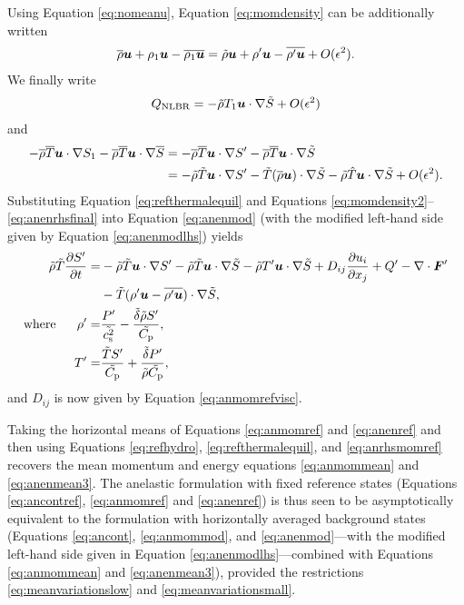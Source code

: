 \documentclass[12pt]{article}
\newcommand{\vecf}{\bm{F}}
\begin{document}
Using Equation \eqref{eq:nomeanu}, Equation \eqref{eq:momdensity} can be additionally written
  \begin{align}\label{eq:momdensity2}
\overline{\rho}\bm{u} + \rho_1\bm{u} - \overline{\rho_1\bm{u}} = \tilde{\rho}\bm{u} + \rho^\prime\bm{u} - \overline{\rho^\prime\bm{u}} + O(\epsilon^2).
\end{align}
We finally write 
\begin{align}
	Q_{\rm NLBR} = -\tilde{\rho} T_1\bm{u}\cdot\nabla\tilde{S} + O(\epsilon^2)
\end{align}
and 
\begin{align}\label{eq:anenrhsfinal}
	-\overline{\rho}\overline{T} \bm{u}\cdot\nabla S_1 - \overline{\rho}\overline{T} \bm{u}\cdot\nabla\overline{S} &= - \overline{\rho}\overline{T}\bm{u}\cdot\nabla S^\prime -\overline{\rho}\overline{T}\bm{u}\cdot\nabla\tilde{S} \nonumber\\
	&=-\tilde{\rho}\tilde{T}\bm{u}\cdot\nabla S^\prime - \tilde{T}(\overline{\rho} \bm{u})\cdot\nabla\tilde{S} - \tilde{\rho}\hat{T}\bm{u}\cdot\nabla\tilde{S} + O(\epsilon^2).
\end{align}
Substituting Equation \eqref{eq:refthermalequil} and Equations \eqref{eq:momdensity2}--\eqref{eq:anenrhsfinal} into Equation \eqref{eq:anenmod} (with the modified left-hand side given by Equation \eqref{eq:anenmodlhs}) yields
\begin{subequations}\label{eq:anenref}
	\begin{align}
		\rhotilde\tilde{T}\pderiv{\entrprime}{t}= &-\rhotilde\tilde{T}\ugrad \entrprime - \rhotilde\tilde{T} \ugrad \entrtilde - \rhotilde \tmpprime\ugrad\entrtilde+D_{ij}\pderiv{u_i}{x_j} + Q^\prime- \Div\vecf^\prime  \nonumber\\
		& - \tilde{T}(\rhoprime \vecu-\overline{\rhoprime\vecu})\cdot\nabla\entrtilde,\label{eq:anenrefmain}\\
		\where \rhoprime =& \frac{\prsprime}{\tilde{\cs^2}}-\frac{\deltatilde \rhotilde S ^\prime}{\cptilde},\\
		 \tmpprime = & \frac{\tilde{T} \entrprime}{\cptilde} + \frac{\deltatilde  \prsprime}{\rhotilde\cptilde},
	\end{align}
\end{subequations}
and $D_{ij}$ is now given by Equation \eqref{eq:anmomrefvisc}. 

Taking the horizontal means of Equations \eqref{eq:anmomref} and \eqref{eq:anenref} and then using Equations \eqref{eq:refhydro}, \eqref{eq:refthermalequil}, and \eqref{eq:anrhsmomref} recovers the mean momentum and energy equations \eqref{eq:anmommean} and \eqref{eq:anenmean3}. The anelastic formulation with fixed reference states (Equations \eqref{eq:ancontref}, \eqref{eq:anmomref} and \eqref{eq:anenref}) is thus seen to be asymptotically equivalent to the formulation with horizontally averaged background states (Equations \eqref{eq:ancont}, \eqref{eq:anmommod}, and \eqref{eq:anenmod}---with the modified left-hand side given in Equation \eqref{eq:anenmodlhs}---combined with Equations \eqref{eq:anmommean} and \eqref{eq:anenmean3}), provided the restrictions \eqref{eq:meanvariationslow} and \eqref{eq:meanvariationsmall}.
\end{document}
